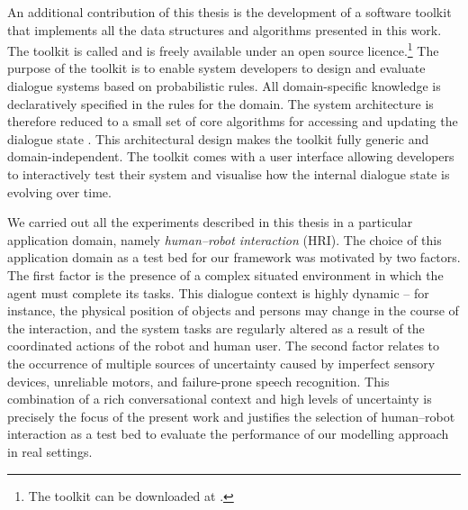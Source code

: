 An additional contribution of this thesis is the development of a software toolkit that implements all the data structures and algorithms presented in this work. The toolkit is called \opendial{}  and is freely available under an open source licence.\footnote{The toolkit can be downloaded at .} The purpose of the toolkit is to enable system developers to design and evaluate dialogue systems based on probabilistic rules. All domain-specific knowledge is declaratively specified in the rules for the domain. The system architecture is therefore reduced to a small set of core algorithms for accessing and updating the dialogue state \citep{lison-semdial2012}. This architectural design makes the toolkit fully generic and domain-independent. The \opendial{} toolkit comes with a user interface allowing developers to interactively test their system and visualise how the internal dialogue state is evolving over time.  %

We carried out all the experiments described in this thesis in a particular application domain, namely \textit{human--robot interaction}  (HRI).  The choice of this application domain as a test bed for our framework was motivated by two factors.  The first factor is the presence of a complex situated environment in which the agent must complete its tasks.  This dialogue context is highly dynamic -- for instance, the physical position of objects and persons may change in the course of the interaction, and the system tasks are regularly altered as a result of the coordinated actions of the robot and human user. The second factor relates to the occurrence of multiple sources of uncertainty caused by imperfect sensory devices, unreliable motors, and failure-prone speech recognition. This combination of a rich conversational context and high levels of uncertainty is precisely the focus of the present work and justifies the selection of  human--robot interaction as a test bed to evaluate the performance of our modelling approach in real settings.

